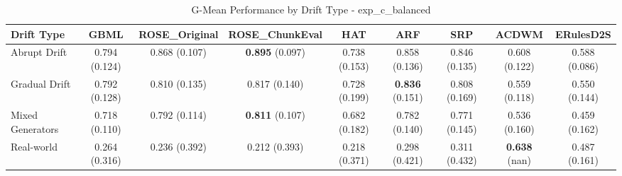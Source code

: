 \begin{table}[htbp]
\centering
\caption{G-Mean Performance by Drift Type - exp_c_balanced}
\label{tab:gmean_by_drift_exp_c_balanced}
\footnotesize
\begin{tabular}{lcccccccc}
\toprule
Drift Type & GBML & ROSE_Original & ROSE_ChunkEval & HAT & ARF & SRP & ACDWM & ERulesD2S \\
\midrule
Abrupt Drift & 0.794 (0.124) & 0.868 (0.107) & \textbf{0.895} (0.097) & 0.738 (0.153) & 0.858 (0.136) & 0.846 (0.135) & 0.608 (0.122) & 0.588 (0.086) \\
Gradual Drift & 0.792 (0.128) & 0.810 (0.135) & 0.817 (0.140) & 0.728 (0.199) & \textbf{0.836} (0.151) & 0.808 (0.169) & 0.559 (0.118) & 0.550 (0.144) \\
Mixed Generators & 0.718 (0.110) & 0.792 (0.114) & \textbf{0.811} (0.107) & 0.682 (0.182) & 0.782 (0.140) & 0.771 (0.145) & 0.536 (0.160) & 0.459 (0.162) \\
Real-world & 0.264 (0.316) & 0.236 (0.392) & 0.212 (0.393) & 0.218 (0.371) & 0.298 (0.421) & 0.311 (0.432) & \textbf{0.638} (nan) & 0.487 (0.161) \\
\bottomrule
\end{tabular}
\end{table}